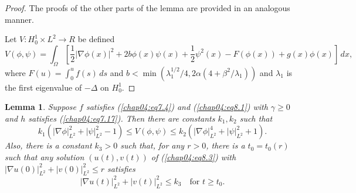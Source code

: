 \documentclass{surv-l}
\theoremstyle{plain}
\newtheorem{lemma}[theorem]{Lemma}
\theoremstyle{definition}
\numberwithin{equation}{section}
\numberwithin{figure}{chapter}
\begin{document}
\begin{proof}
The proofs of the other parts of the lemma are provided in an analogous manner.

Let $V\!:H_{0}^{1}\times L^{2}\rightarrow R$ be defined
\begin{equation}\label{chap04:eq8.4}
V(\phi, \psi)=\int_{\Omega}\left[\frac{1}{2}|\nabla\phi(x)|^{2}+2b\phi(x)\psi(x)+\frac{1}{2}\psi^{2}(x)-F(\phi(x))+g(x)\phi(x)\right]\,dx,
\end{equation}
where $F(u)= \int_{0}^{u}f(s)\,ds$ and $b<\min(\lambda_{1}^{1/2}/4,2\alpha(4+\beta^{2}/\lambda_{1}))$ and $\lambda_{1}$ is the first eigenvalue of $-\Delta$ on $H_{0}^{1}$.
\end{proof}

\begin{lemma}\label{lem4.8.5} Suppose $f$ satisfies \emph{(\ref{chap04:eq7.4})} and \emph{(\ref{chap04:eq8.1})} with $\gamma\geq 0$ and $h$ satisfies \emph{(\ref{chap04:eq7.17})}. Then there are constants $k_{1}, k_{2}$ such that
\begin{equation}\label{chap04:eq8.5}
k_{1}(|\nabla\phi|_{L^{2}}^{2}+|\psi|_{L^{2}}^{2}-1)\leq V(\phi, \psi)\leq k_{2}(|\nabla\phi|_{L^{2}}^{4}+|\psi|_{L^{2}}^{2}+1).
\end{equation}
Also, there is a constant $k_{3}>0$ such that, for any $r>0$, there is a $t_{0}=t_{0}(r)$ such that any solution $(u(t), v(t))$ of \emph{(\ref{chap04:eq8.3})} with $|\nabla u(0)|_{L^{2}}^{2}+|v(0)|_{L^{2}}^{2}\leq r$ satisfies
\begin{equation}\label{chap04:eq8.6}
|\nabla u(t)|_{L^{2}}^{2}+|v(t)|_{L^{2}}^{2}\leq k_{3}\quad \text{for } t\geq t_{0}.
\end{equation}
\end{lemma}
\end{document}
